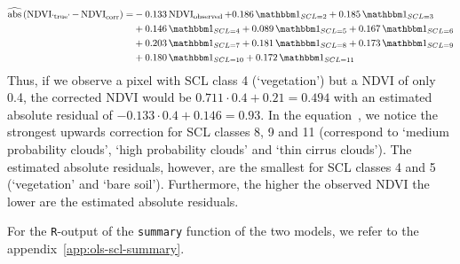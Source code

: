 	\begin{equation}\label{eq:corr_lm_res}
		\begin{aligned}		
			\widehat{\operatorname{abs}}\left({\operatorname{NDVI}_\text{`true'} - \operatorname{NDVI}}_{\text{corr}}\right)  = &
			-0.133 \operatorname{NDVI}_\text{observed}  
			+ 0.186 \, \mathbbm 1_{{SCL = 2}} 
			+ 0.185 \, \mathbbm 1_{{SCL = 3}} \\ &
			+ 0.146 \, \mathbbm 1_{{SCL = 4}} 
			+ 0.089 \, \mathbbm 1_{{SCL = 5}} 
			+ 0.167 \, \mathbbm 1_{{SCL = 6}} \\ &
			+ 0.203 \, \mathbbm 1_{{SCL = 7}} 
			+ 0.181 \, \mathbbm 1_{{SCL = 8}}  
			+ 0.173 \, \mathbbm 1_{{SCL = 9}} \\ &
			+ 0.180 \, \mathbbm 1_{{SCL = 10}} 
			+ 0.172 \, \mathbbm 1_{{SCL = 11}} 
		\end{aligned}
	\end{equation} 
	Thus, if we observe a pixel with SCL class 4 (`vegetation') but a NDVI of only 0.4, the corrected NDVI would be $0.711 \cdot 0.4 + 0.21 = 0.494$ with an estimated absolute residual of $-0.133 \cdot 0.4 + 0.146 = 0.93$.
	In the equation~, we notice the strongest upwards correction for SCL classes 8, 9 and 11 (correspond to `medium probability clouds', `high probability clouds' and `thin cirrus clouds'). The estimated absolute residuals, however, are the smallest for SCL classes 4 and 5 (`vegetation' and `bare soil'). Furthermore, the higher the observed NDVI the lower are the estimated absolute residuals.

	For the \texttt{R}-output of the \texttt{summary} function of the two models, we refer to the appendix~\ref{app:ols-scl-summary}. 


	








